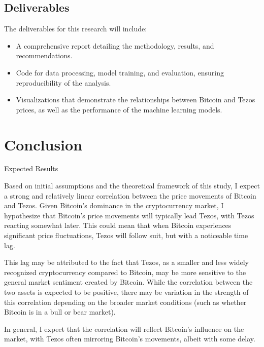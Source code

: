 \subsection{Deliverables}
The deliverables for this research will include:

\begin{itemize}
    \item A comprehensive report detailing the methodology, results, and recommendations.
    \item Code for data processing, model training, and evaluation, ensuring reproducibility of the analysis.
    \item Visualizations that demonstrate the relationships between Bitcoin and Tezos prices, as well as the performance of the machine learning models.
\end{itemize}


\section{Conclusion}%
\label{sec:verwachte_resultaten}

Expected Results

Based on initial assumptions and the theoretical framework of this study, I expect a strong and relatively linear correlation between the price movements of Bitcoin and Tezos. Given Bitcoin’s dominance in the cryptocurrency market, I hypothesize that Bitcoin’s price movements will typically lead Tezos, with Tezos reacting somewhat later. This could mean that when Bitcoin experiences significant price fluctuations, Tezos will follow suit, but with a noticeable time lag.

This lag may be attributed to the fact that Tezos, as a smaller and less widely recognized cryptocurrency compared to Bitcoin, may be more sensitive to the general market sentiment created by Bitcoin. While the correlation between the two assets is expected to be positive, there may be variation in the strength of this correlation depending on the broader market conditions (such as whether Bitcoin is in a bull or bear market).

In general, I expect that the correlation will reflect Bitcoin’s influence on the market, with Tezos often mirroring Bitcoin's movements, albeit with some delay.
